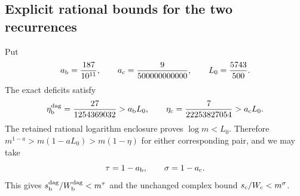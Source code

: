 \subsection{Explicit rational bounds for the two recurrences}
Put
\[
 a_{\rm b}=\frac{187}{10^{11}},\qquad
 a_{\rm c}=\frac9{500000000000},\qquad L_0=\frac{5743}{500}.
\]
The exact deficits satisfy
\[
 \eta_{\rm b}^{\rm dag}=\frac{27}{1254369032}>a_{\rm b}L_0,
 \qquad \eta_{\rm c}=\frac7{22253827054}>a_{\rm c}L_0.
\]
The retained rational logarithm enclosure proves $\log m<L_0$. Therefore
$m^{1-a}>m(1-aL_0)>m(1-\eta)$ for either corresponding pair, and we may take
\begin{equation}\label{eq:explicit-motif-exponents}
 \tau=1-a_{\rm b},\qquad\sigma=1-a_{\rm c}.
\end{equation}
This gives $s_{\rm b}^{\rm dag}/W_{\rm b}^{\rm dag}<m^\tau$ and the
unchanged complex bound $s_{\rm c}/W_{\rm c}<m^\sigma$.
